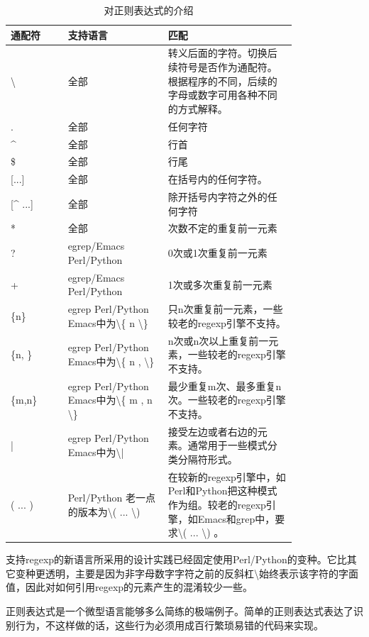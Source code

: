 \documentclass[12pt,oneside]{book}
\begin{document}
\begin{table}[H]
\centering
\caption{对正则表达式的介绍}
\medskip 
\begin{tabular}{@{}lp{0.35\linewidth}p{0.45\linewidth}@{}}
\toprule
通配符 & 支持语言 & 匹配  \\ \midrule
\textbackslash  & 全部 & 转义后面的字符。切换后续符号是否作为通配符。根据程序的不同，后续的字母或数字可用各种不同的方式解释。  \\
.  & 全部 & 任何字符 \\
\^{} & 全部 & 行首 \\
\${}  & 全部 &  行尾 \\{}
[...]  & 全部 & 在括号内的任何字符。\\{}
[\^{} ...] & 全部 & 除开括号内字符之外的任何字符\\
* & 全部 & 次数不定的重复前一元素 \\
? & egrep/Emacs Perl/Python & 0次或1次重复前一元素 \\
+ &  egrep/Emacs Perl/Python & 1次或多次重复前一元素  \\
\{n\} & egrep Perl/Python Emacs中为\textbackslash{}\{ n  \textbackslash  \}  & 只n次重复前一元素，一些较老的regexp引擎不支持。\\
\{n, \} & egrep Perl/Python Emacs中为\textbackslash{}\{ n , \textbackslash  \}  & n次或n次以上重复前一元素，一些较老的regexp引擎不支持。 \\
\{m,n\} & egrep  Perl/Python Emacs中为\textbackslash{}\{ m , n \textbackslash  \}  & 最少重复m次、最多重复n次。一些较老的regexp引擎不支持。 \\
| &  egrep  Perl/Python Emacs中为\textbackslash{}|  & 接受左边或者右边的元素。通常用于一些模式分类分隔符形式。\\
( ... ) &  Perl/Python  老一点的版本为\textbackslash ( ... \textbackslash )  &  在较新的regexp引擎中，如Perl和Python把这种模式作为组。较老的regexp引擎，如Emacs和grep中，要求\textbackslash ( ... \textbackslash ) 。
 \\ \bottomrule
\end{tabular}
\end{table}

支持regexp的新语言所采用的设计实践已经固定使用Perl/Python的变种。它比其它变种更透明，主要是因为非字母数字字符之前的反斜杠\textbackslash 始终表示该字符的字面值，因此对如何引用regexp的元素产生的混淆较少一些。

正则表达式是一个微型语言能够多么简练的极端例子。简单的正则表达式表达了识别行为，不这样做的话，这些行为必须用成百行繁琐易错的代码来实现。
\end{document}
